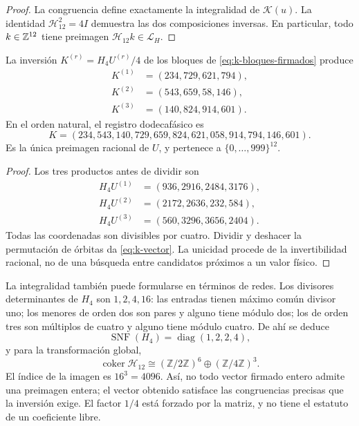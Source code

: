 \begin{proof}
La congruencia define exactamente la integralidad de \(\mathscr K(u)\).
La identidad \(\mathcal H_{12}^2=4I\) demuestra las dos composiciones
inversas. En particular, todo \(k\in\mathbb Z^{12}\) tiene preimagen
\(\mathcal H_{12}k\in\mathcal L_H\).
\end{proof}

\begin{proposition}
\label{prop:k-sello}
La inversión \(K^{(r)}=H_4U^{(r)}/4\) de los bloques de
\eqref{eq:k-bloques-firmados} produce
\begin{align*}
 K^{(1)}&=(234,729,621,794),\\
 K^{(2)}&=(543,659,58,146),\\
 K^{(3)}&=(140,824,914,601).
\end{align*}
En el orden natural, el registro dodecafásico es
\begin{equation}
 K=(234,543,140,729,659,824,621,058,914,794,146,601).
 \label{eq:k-vector}
\end{equation}
Es la única preimagen racional de \(U\), y pertenece a
\(\{0,\ldots,999\}^{12}\).
\end{proposition}

\begin{proof}
Los tres productos antes de dividir son
\begin{align*}
 H_4U^{(1)}&=(936,2916,2484,3176),\\
 H_4U^{(2)}&=(2172,2636,232,584),\\
 H_4U^{(3)}&=(560,3296,3656,2404).
\end{align*}
Todas las coordenadas son divisibles por cuatro. Dividir y deshacer la
permutación de órbitas da \eqref{eq:k-vector}. La unicidad procede de la
invertibilidad racional, no de una búsqueda entre candidatos próximos a
un valor físico.
\end{proof}

La integralidad también puede formularse en términos de redes. Los
divisores determinantes de \(H_4\) son \(1,2,4,16\): las entradas
tienen máximo común divisor uno; los menores de orden dos son pares y
alguno tiene módulo dos; los de orden tres son múltiplos de cuatro y
alguno tiene módulo cuatro. De ahí se deduce
\[
 \operatorname{SNF}(H_4)=\operatorname{diag}(1,2,2,4),
\]
y para la transformación global,
\[
 \operatorname{coker}\mathcal H_{12}
 \cong(\mathbb Z/2\mathbb Z)^6\oplus(\mathbb Z/4\mathbb Z)^3.
\]
El índice de la imagen es \(16^3=4096\). Así, no todo vector firmado
entero admite una preimagen entera; el vector obtenido satisface las
congruencias precisas que la inversión exige. El factor \(1/4\) está
forzado por la matriz, y no tiene el estatuto de un coeficiente libre.

